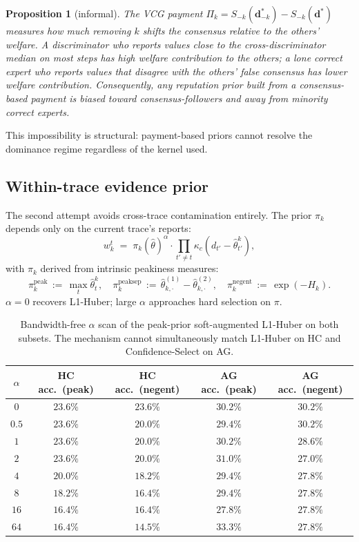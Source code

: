 \documentclass[11pt]{article}
\newtheorem{proposition}[theorem]{Proposition}
\newcommand{\thetahat}{\hat{\theta}}
\newcommand{\db}{\bm{d}}
\begin{document}
\begin{proposition}[informal]
\label{prop:payment-bias}
The VCG payment $\Pi_k = S_{-k}(\db^*_{-k}) - S_{-k}(\db^*)$ measures how
much removing $k$ shifts the consensus relative to the others' welfare. A
discriminator who reports values close to the cross-discriminator median
on most steps has high welfare contribution to the others; a lone correct
expert who reports values that disagree with the others' false consensus
has lower welfare contribution. Consequently, any reputation prior built
from a consensus-based payment is biased toward consensus-followers and
away from minority correct experts.
\end{proposition}

This impossibility is structural: payment-based priors cannot resolve the
dominance regime regardless of the kernel used.

\subsection{Within-trace evidence prior}

The second attempt avoids cross-trace contamination entirely. The prior
$\pi_k$ depends only on the current trace's reports:
\[
w_k^t \;=\; \pi_k(\thetahat)^\alpha \cdot \prod_{t' \neq t} \kappa_c(d_{t'} - \thetahat^k_{t'}),
\]
with $\pi_k$ derived from intrinsic peakiness measures:
\[
\pi_k^{\text{peak}}\, := \, \max_t \thetahat^k_t,
\quad
\pi_k^{\text{peaksep}}\, := \, \thetahat^{(1)}_{k,\cdot} - \thetahat^{(2)}_{k,\cdot},
\quad
\pi_k^{\text{negent}}\, := \, \exp(-H_k).
\]
$\alpha = 0$ recovers L1-Huber; large $\alpha$ approaches hard selection on
$\pi$.

\begin{table}[h]
\centering
\small
\caption{Bandwidth-free $\alpha$ scan of the peak-prior soft-augmented
L1-Huber on both subsets. The mechanism cannot simultaneously match
L1-Huber on HC and Confidence-Select on AG.}
\label{tab:alpha-scan}
\begin{tabular}{c|cc|cc}
\toprule
$\alpha$ & HC acc.\ (peak) & HC acc.\ (negent) & AG acc.\ (peak) & AG acc.\ (negent) \\
\midrule
$0$  & $\mathbf{23.6\%}$ & $\mathbf{23.6\%}$ & $30.2\%$ & $30.2\%$ \\
$0.5$ & $23.6\%$ & $20.0\%$ & $29.4\%$ & $30.2\%$ \\
$1$  & $23.6\%$ & $20.0\%$ & $30.2\%$ & $28.6\%$ \\
$2$  & $23.6\%$ & $20.0\%$ & $31.0\%$ & $27.0\%$ \\
$4$  & $20.0\%$ & $18.2\%$ & $29.4\%$ & $27.8\%$ \\
$8$  & $18.2\%$ & $16.4\%$ & $29.4\%$ & $27.8\%$ \\
$16$ & $16.4\%$ & $16.4\%$ & $27.8\%$ & $27.8\%$ \\
$64$ & $16.4\%$ & $14.5\%$ & $33.3\%$ & $27.8\%$ \\
\bottomrule
\end{tabular}
\end{table}
\end{document}

